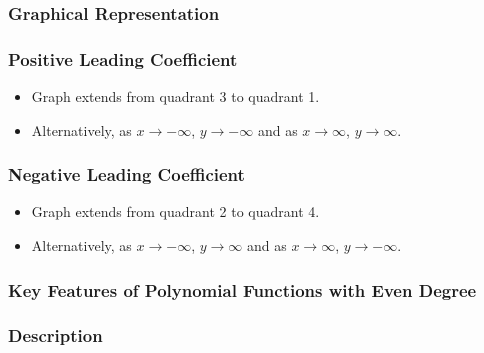 \documentclass{article}
\begin{document}
\subsubsection*{Graphical Representation}

\begin{center}
\end{center}

\subsubsection*{Positive Leading Coefficient}

\begin{itemize}
    \item Graph extends from quadrant 3 to quadrant 1.
    \item Alternatively, as \( x \to -\infty \), \( y \to -\infty \) and as \( x \to \infty \), \( y \to \infty \).
\end{itemize}

\subsubsection*{Negative Leading Coefficient}

\begin{itemize}
    \item Graph extends from quadrant 2 to quadrant 4.
    \item Alternatively, as \( x \to -\infty \), \( y \to \infty \) and as \( x \to \infty \), \( y \to -\infty \).
\end{itemize}




\subsubsection{Key Features of Polynomial Functions with Even Degree}

\subsubsection*{Description}
\end{document}

